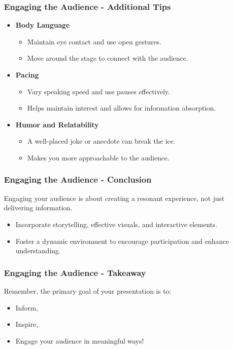 \documentclass[aspectratio=169]{beamer}
\begin{document}
\begin{frame}[fragile]
    \frametitle{Engaging the Audience - Additional Tips}
    \begin{itemize}
        \item \textbf{Body Language}
            \begin{itemize}
                \item Maintain eye contact and use open gestures.
                \item Move around the stage to connect with the audience.
            \end{itemize}
        
        \item \textbf{Pacing}
            \begin{itemize}
                \item Vary speaking speed and use pauses effectively.
                \item Helps maintain interest and allows for information absorption.
            \end{itemize}
        
        \item \textbf{Humor and Relatability}
            \begin{itemize}
                \item A well-placed joke or anecdote can break the ice.
                \item Makes you more approachable to the audience.
            \end{itemize}
    \end{itemize}
\end{frame}

\begin{frame}[fragile]
    \frametitle{Engaging the Audience - Conclusion}
    Engaging your audience is about creating a resonant experience, not just delivering information. 
    \begin{itemize}
        \item Incorporate storytelling, effective visuals, and interactive elements.
        \item Foster a dynamic environment to encourage participation and enhance understanding.
    \end{itemize}
\end{frame}

\begin{frame}[fragile]
    \frametitle{Engaging the Audience - Takeaway}
    Remember, the primary goal of your presentation is to:
    \begin{itemize}
        \item Inform,
        \item Inspire,
        \item Engage your audience in meaningful ways!
    \end{itemize}
\end{frame}
\end{document}

